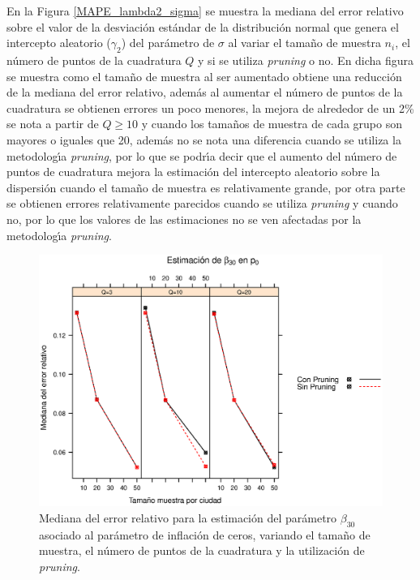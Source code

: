 En la Figura \ref{MAPE_lambda2_sigma} se muestra la mediana del error relativo sobre el valor de la desviaci\'{o}n est\'{a}ndar de la distribuci\'{o}n normal que genera el intercepto aleatorio ($\gamma_2$) del par\'{a}metro de $\sigma$ al variar el tama\~{n}o de muestra $n_i$, el n\'{u}mero de puntos de la cuadratura $Q$ y si se utiliza \textit{pruning} o no. En dicha figura se muestra como el tama\~{n}o de muestra al ser aumentado obtiene una reducci\'{o}n de la mediana del error relativo, adem\'{a}s al aumentar el n\'{u}mero de puntos de la cuadratura se obtienen errores un poco menores, la mejora de alrededor de un 2\% se nota a partir de $Q\geq10$ y cuando los tama\~{n}os de muestra de cada grupo son mayores o iguales que 20, adem\'{a}s no se nota una diferencia cuando se utiliza la metodolog\'{\i}a \textit{pruning}, por lo que se podr\'{\i}a decir que el aumento del n\'{u}mero de puntos de cuadratura mejora la estimaci\'{o}n del intercepto aleatorio sobre la dispersi\'{o}n cuando el tama\~{n}o de muestra es relativamente grande, por otra parte se obtienen errores relativamente parecidos cuando se utiliza \textit{pruning} y cuando no, por lo que los valores de las estimaciones no se ven afectadas por la metodolog\'{\i}a \textit{pruning}.\\


\begin{figure}
	\begin{center}
		\includegraphics[scale=0.6]{MAPE_beta0_p0.eps}	
		\caption{Mediana del error relativo para la estimaci\'{o}n del par\'{a}metro $\beta_{30}$ asociado al par\'{a}metro de inflaci\'{o}n de ceros, variando el tama\~{n}o de muestra, el n\'{u}mero de puntos de la cuadratura y la utilizaci\'{o}n de \textit{pruning}.}
		\label{MAPE_beta0_p0}
	\end{center}
\end{figure}

